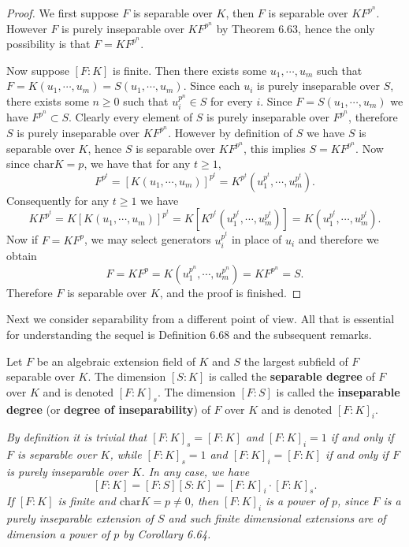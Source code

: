 \begin{proof}
We first suppose $F$ is separable over $K$, then $F$ is separable over $KF^{p^n}$. However $F$ is purely inseparable over $KF^{p^n}$ by Theorem 6.63, hence the only possibility is that $F=KF^{p^n}$.\par
Now suppose $[F:K]$ is finite. Then there exists some $u_1,\cdots,u_m$ such that $F=K(u_1,\cdots,u_m)=S(u_1,\cdots,u_m)$. Since each $u_i$ is purely inseparable over $S$, there exists some $n\ge 0$ such that $u_i^{p^n}\in S$ for every $i$. Since $F=S(u_1,\cdots,u_m)$ we have $F^{p^n}\subset S$. Clearly every element of $S$ is purely inseparable over $F^{p^n}$, therefore $S$ is purely inseparable over $KF^{p^n}$. However by definition of $S$ we have $S$ is separable over $K$, hence $S$ is separable over $KF^{p^n}$, this implies $S=KF^{p^n}$. Now since $\mathrm{char}K=p$, we have that for any $t\ge 1$, 
$$
F^{p^t}=\left[ K\left( u_1,\cdots ,u_m \right) \right] ^{p^t}=K^{p^t}\left( u_{1}^{p^t},\cdots ,u_{m}^{p^t} \right) .
$$
Consequently for any $t\ge 1$ we have 
$$
KF^{p^t}=K\left[ K\left( u_1,\cdots ,u_m \right) \right] ^{p^t}=K\left[ K^{p^t}\left( u_{1}^{p^t},\cdots ,u_{m}^{p^t} \right) \right] =K\left( u_{1}^{p^t},\cdots ,u_{m}^{p^t} \right) .
$$
Now if $F=KF^p$, we may select generators $u_i^{p^t}$ in place of $u_i$ and therefore we obtain 
$$
F=KF^p=K\left( u_{1}^{p^n},\cdots ,u_{m}^{p^n} \right) =KF^{p^n}=S.
$$
Therefore $F$ is separable over $K$, and the proof is finished.
\end{proof}
Next we consider separability from a different point of view. All that is essential for understanding the sequel is Definition 6.68 and the subsequent remarks.
\begin{definition}
Let $F$ be an algebraic extension field of $K$ and $S$ the largest subfield of $F$ separable over $K$. The dimension $[S:K]$ is called the \textbf{separable degree} of $F$ over $K$ and is denoted $[F:K]_s$. The dimension $[F:S]$ is called the \textbf{inseparable degree} (or \textbf{degree of inseparability}) of $F$ over $K$ and is denoted $[F:K]_i$.
\end{definition}
\begin{note}\em
By definition it is trivial that $[F:K]_s=[F:K]$ and $[F:K]_i=1$ if and only if $F$ is separable over $K$, while $[F:K]_s=1$ and $[F:K]_i=[F:K]$ if and only if $F$ is purely inseparable over $K$. In any case, we have 
$$
\left[ F:K \right] =\left[ F:S \right] \left[ S:K \right] =\left[ F:K \right] _i\cdot \left[ F:K \right] _s.
$$
If $[F:K]$ is finite and $\mathrm{char}K=p\ne 0$, then $[F:K]_i$ is a power of $p$, since $F$ is a purely inseparable extension of $S$ and such finite dimensional extensions are of dimension a power of $p$ by Corollary 6.64.
\end{note}

